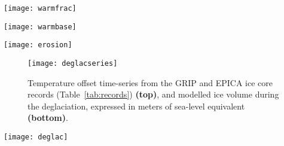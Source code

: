 \documentclass[tc, manuscript]{copernicus}
\newcommand{\todo}[1]{\emph{[\textbf{Todo:} #1]}}
\begin{document}
\begin{figure*}
  \texttt{[image: warmfrac]}
  \caption{Modelled fraction of warm-based ice cover during the ice-covered
           period. Note the dominance of warm-based conditions on the
           continental shelf and major glacial troughs of the coastal ranges.
           Hatches indicate areas that were covered by cold ice only.
           \todo{indicate location of the Skeena Mountains.}}
  \label{fig:warmfrac}
\end{figure*}

\begin{figure*}
  \texttt{[image: warmbase]}
  \caption{Modelled duration of warm-based ice cover during the last
           120\,kyr. Long ice cover durations combined with basal
           temperatures at the pressure-melting point may explain the strong
           glacial erosional imprint of the Skeena Mountains (SM) landscape.
           Hatches indicate areas that were covered by cold ice only.
           \todo{indicate location of the Skeena Mountains.}}
  \label{fig:warmbase}
\end{figure*}

\begin{figure*}
  \texttt{[image: erosion]}
  \caption{Modelled cumulative basal displacement (integrand of basal velocity)
           over the last 120\,kyr.
           \todo{remove this figure (see footnote in text).}}
  \label{fig:erosion}
\end{figure*}

\begin{figure}
  \texttt{[image: deglacseries]}
  \caption{Temperature offset time-series from the GRIP and EPICA ice core
           records (Table~\ref{tab:records}) \textbf{(top)}, and modelled ice
           volume during the deglaciation, expressed in meters of sea-level
           equivalent \textbf{(bottom)}.}
  \label{fig:deglacseries}
\end{figure}

\begin{figure*}
  \texttt{[image: deglac]}
  \caption{Modelled age of the last deglaciation. Areas where the MIS~4 glacial
           advance exceeded the last glacial maximum advanced are marked in
           green. Hatches denote re-advance of mountain-centred ice caps and
           and the decaying ice sheet between 14 and 10\,kyr., which is more
           pronounced in the GRIP-driven simulation.}
  \label{fig:deglac}
\end{figure*}
\end{document}
